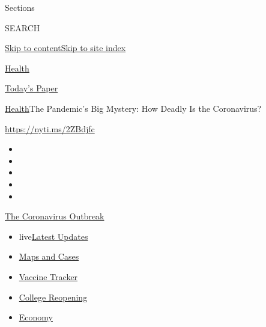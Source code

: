 Sections

SEARCH

\protect\hyperlink{site-content}{Skip to
content}\protect\hyperlink{site-index}{Skip to site index}

\href{https://www.nytimes.com/section/health}{Health}

\href{https://myaccount.nytimes.com/auth/login?response_type=cookie\&client_id=vi}{}

\href{https://www.nytimes.com/section/todayspaper}{Today's Paper}

\href{/section/health}{Health}\textbar{}The Pandemic's Big Mystery: How
Deadly Is the Coronavirus?

\url{https://nyti.ms/2ZBdjfc}

\begin{itemize}
\item
\item
\item
\item
\item
\end{itemize}

\href{https://www.nytimes.com/news-event/coronavirus?action=click\&pgtype=Article\&state=default\&region=TOP_BANNER\&context=storylines_menu}{The
Coronavirus Outbreak}

\begin{itemize}
\tightlist
\item
  live\href{https://www.nytimes.com/2020/08/04/world/coronavirus-cases.html?action=click\&pgtype=Article\&state=default\&region=TOP_BANNER\&context=storylines_menu}{Latest
  Updates}
\item
  \href{https://www.nytimes.com/interactive/2020/us/coronavirus-us-cases.html?action=click\&pgtype=Article\&state=default\&region=TOP_BANNER\&context=storylines_menu}{Maps
  and Cases}
\item
  \href{https://www.nytimes.com/interactive/2020/science/coronavirus-vaccine-tracker.html?action=click\&pgtype=Article\&state=default\&region=TOP_BANNER\&context=storylines_menu}{Vaccine
  Tracker}
\item
  \href{https://www.nytimes.com/2020/08/02/us/covid-college-reopening.html?action=click\&pgtype=Article\&state=default\&region=TOP_BANNER\&context=storylines_menu}{College
  Reopening}
\item
  \href{https://www.nytimes.com/live/2020/08/04/business/stock-market-today-coronavirus?action=click\&pgtype=Article\&state=default\&region=TOP_BANNER\&context=storylines_menu}{Economy}
\end{itemize}

